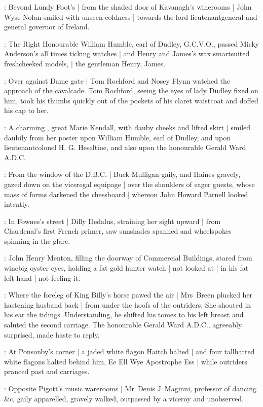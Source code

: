 :
Beyond Lundy Foot's |
from the shaded door of Kavanagh's winerooms |
John Wyse Nolan smiled with unseen coldness |
towards the lord lieutenantgeneral and general governor of Ireland.

:
The Right Honourable
William Humble,
earl of Dudley,
G.C.V.O.,
passed Micky Anderson's
all times ticking watches |
and Henry and James's wax smartsuited freshcheeked models, |
the gentleman Henry,
 James.

:
Over against Dame gate |
Tom Rochford and Nosey Flynn
watched the approach of the cavalcade.
Tom Rochford,
seeing the eyes of lady Dudley fixed on him,
took his thumbs
quickly out of the pockets of his claret waistcoat
and doffed his cap to her.%

:
A charming ,
great Marie Kendall, with dauby cheeks and lifted skirt |
smiled daubily from her poster
upon William Humble, earl of Dudley,
and upon lieutenant\-colonel H. G. Heseltine,
and also upon the honourable Gerald Ward A.D.C\@.

:
From the window of the D.B.C. |
Buck Mulligan gaily,
and Haines gravely,
gazed down on the viceregal equipage |
over the shoulders of eager guests,
whose mass of forms
darkened the chessboard |
whereon John Howard Parnell looked intently.

:
In Fownes's street |
Dilly Dedalus,
straining her sight upward |
from Chardenal's first French primer,
saw sunshades spanned
and wheelspokes spinning in the glare.

:
John Henry Menton,
filling the doorway of Commercial Buildings,%
stared from winebig oyster eyes,
holding a fat gold hunter watch |
not looked at |
in his fat left hand |
not feeling it.

:
Where the foreleg of King Billy's horse pawed the air |
Mrs~Breen plucked her hastening husband back |
from under the hoofs of the outriders.
She shouted in his ear the tidings.
Understanding, he shifted his tomes to his left breast
and saluted the second carriage.
The honourable Gerald Ward A.D.C.,
agreeably surprised,
made haste to reply.

:
At Ponsonby's corner |
a jaded white flagon Haitch \stage{[H.]} halted |
and four tallhatted white flagons halted behind him,
Ee Ell Wye Apostrophe Ess \stage{[E.L.Y.'S]} |
while outriders pranced past
and carriages.

:
Opposite Pigott's music warerooms |
Mr~Denis J~Maginni,
professor of dancing \&c,
gaily apparelled,
gravely walked,%
outpassed by a viceroy and unobserved.


